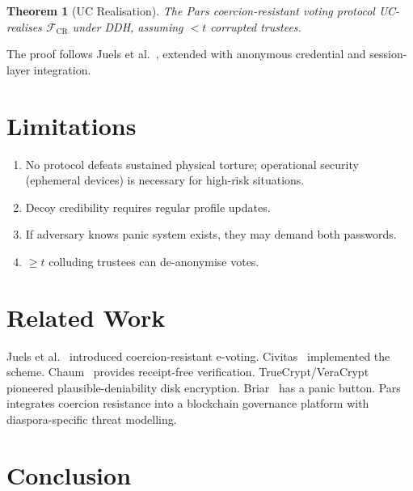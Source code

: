 \documentclass[11pt,a4paper]{article}
\newtheorem{theorem}{Theorem}[section]
\begin{document}
\begin{theorem}[UC Realisation]
    The Pars coercion-resistant voting protocol UC-realises
    $\mathcal{F}_{\mathrm{CR}}$ under DDH, assuming $< t$ corrupted
    trustees.
\end{theorem}

The proof follows Juels et al.~\cite{juels2005coercion}, extended with
anonymous credential and session-layer integration.

\section{Limitations}
\label{sec:limitations}

\begin{enumerate}
    \item No protocol defeats sustained physical torture; operational
    security (ephemeral devices) is necessary for high-risk situations.
    \item Decoy credibility requires regular profile updates.
    \item If adversary knows panic system exists, they may demand both
    passwords.
    \item $\geq t$ colluding trustees can de-anonymise votes.
\end{enumerate}

\section{Related Work}
\label{sec:related}

Juels et al.~\cite{juels2005coercion} introduced coercion-resistant
e-voting.  Civitas~\cite{clarkson2008civitas} implemented the scheme.
Chaum~\cite{chaum2004receipt} provides receipt-free verification.
TrueCrypt/VeraCrypt~\cite{truecrypt2004,veracrypt2015} pioneered
plausible-deniability disk encryption.  Briar~\cite{briar2017} has a
panic button.  Pars integrates coercion resistance into a blockchain
governance platform with diaspora-specific threat modelling.

\section{Conclusion}
\label{sec:conclusion}
\end{document}
